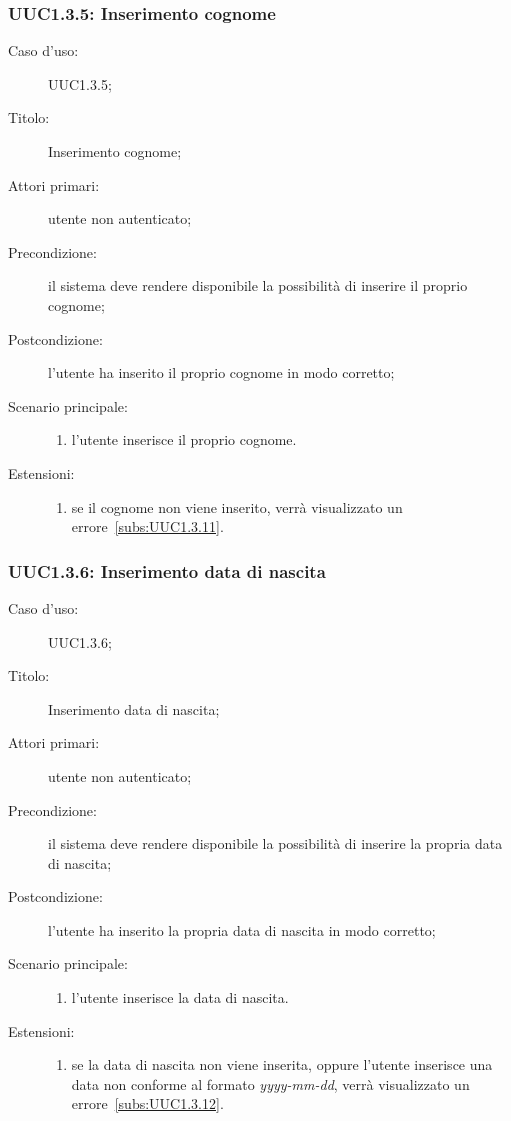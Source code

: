 \documentclass[../../../analisi-dei-requisiti.tex]{subfiles}
\begin{document}
\subsubsection{UUC1.3.5: Inserimento cognome}%
\label{subs:UUC1.3.5}
\begin{description}
  \item[Caso d'uso:] UUC1.3.5;
  \item[Titolo:] Inserimento cognome;
  \item[Attori primari:] utente non autenticato;
  \item[Precondizione:] il sistema deve rendere disponibile la possibilità di inserire il proprio cognome;
  \item[Postcondizione:] l'utente ha inserito il proprio cognome in modo corretto;
  \item[Scenario principale:]
        \begin{enumerate}
          \item l'utente inserisce il proprio cognome.
        \end{enumerate}
  \item[Estensioni:]
        \begin{enumerate}
          \item se il cognome non viene inserito, verrà visualizzato un errore~\ref{subs:UUC1.3.11}.
        \end{enumerate}
\end{description}

\subsubsection{UUC1.3.6: Inserimento data di nascita}%
\label{subs:UUC1.3.6}
\begin{description}
  \item[Caso d'uso:] UUC1.3.6;
  \item[Titolo:] Inserimento data di nascita;
  \item[Attori primari:] utente non autenticato;
  \item[Precondizione:] il sistema deve rendere disponibile la possibilità di inserire la propria data di nascita;
  \item[Postcondizione:] l'utente ha inserito la propria data di nascita in modo corretto;
  \item[Scenario principale:]
        \begin{enumerate}
          \item l'utente inserisce la data di nascita.
        \end{enumerate}
  \item[Estensioni:]
        \begin{enumerate}
          \item se la data di nascita non viene inserita, oppure l'utente inserisce una data non conforme al formato \textit{yyyy-mm-dd}, verrà visualizzato un errore~\ref{subs:UUC1.3.12}.
        \end{enumerate}
\end{description}
\end{document}
